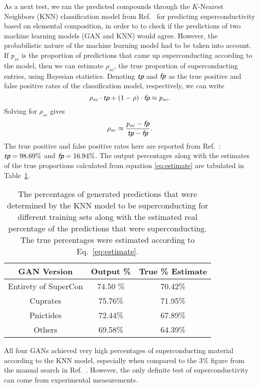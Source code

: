 As a next test, we ran the predicted compounds through the $K$-Nearest Neighbors (KNN) classification model from Ref.~\cite{ROTER20201353689} for predicting superconductivity based on elemental composition, in order to to check if the predictions of two machine learning models (GAN and KNN) would agree. However, the probabilistic nature of the machine learning model had to be taken into account. If $p_{sc}$ is the proportion of predictions that came up superconducting according to the model, then we can estimate $\rho_{sc}$, the true proportion of superconducting entries, using Bayesian statistics. Denoting $\textit{\textsf{tp}}$ and $\textit{\textsf{fp}}$ as the true positive and false positive rates of the classification model, respectively, we can write
\begin{equation}
    \rho_{sc} \cdot \textit{\textsf{tp}} + (1-\rho) \cdot \textit{\textsf{fp}} \approx p_{sc}.
\end{equation}
Solving for $\rho_{sc}$ gives
\begin{equation}\label{eq:estimate}
    \rho_{sc} \approx \frac{p_{sc} - \textit{\textsf{fp}}}{\textit{\textsf{tp}} - \textit{\textsf{fp}}}.
\end{equation}
The true positive and false positive rates here are reported from Ref.~\cite{ROTER20201353689}:  $\textit{\textsf{tp}} = 98.69\%$ and $\textit{\textsf{fp}} = 16.94\%$. The output percentages along with the estimates of the true proportions calculated from equation \ref{eq:estimate} are tabulated in Table~\ref{tab:supercon_percentages}.

\begin{table}
    \centering
    \begin{ruledtabular}
    \begin{tabular}{ccc}
    GAN Version & Output \% & True \% Estimate \\
    \hline
    Entirety of SuperCon & 74.50 \% & 70.42\%  \\
    Cuprates  & 75.76\% & 71.95\% \\
    Pnictides & 72.44\% & 67.89\% \\
    Others & 69.58\% & 64.39\% \\
    \end{tabular}
    \end{ruledtabular}
    \caption{The percentages of generated predictions that were determined by the KNN model to be superconducting for different training sets along with the estimated real percentage of the predictions that were superconducting. The true percentages were estimated according to Eq.~\ref{eq:estimate}.}
    \label{tab:supercon_percentages}
\end{table}
All four GANs achieved very high percentages of superconducting material according to the KNN model, especially when compared to the 3\% figure from the manual search in Ref.~\cite{Hosono2015}. However, the only definite test of superconductivity can come from experimental measurements.

